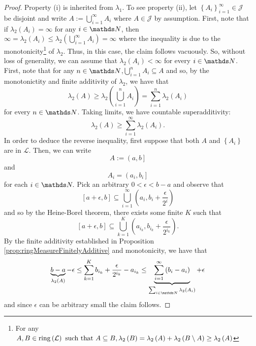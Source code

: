 \begin{proof}
Property (i) is inherited from $\lambda_{1}$. To see property (ii),
let $\left\{ A_{i}\right\} _{i=1}^{\infty}\in\mathcal{J}$ be disjoint
and write $A:=\bigcup_{i=1}^{\infty}A_{i}$ where $A\in\mathcal{J}$
by assumption. First, note that if $\lambda_{2}\left(A_{i}\right)=\infty$
for any $i\in\N$, then $\infty=\lambda_{2}\left(A_{i}\right)\leq\lambda_{2}\left(\bigcup_{i=1}^{\infty}A_{i}\right)=\infty$
where the inequality is due to the monotonicity\footnote{For any $A,B\in\mathrm{ring}\left(\mathcal{L}\right)\text{ such that }A\subseteq B,\lambda_{2}\left(B\right)=\lambda_{2}\left(A\right)+\lambda_{2}\left(B\setminus A\right)\geq\lambda_{2}\left(A\right)$}
of $\lambda_{2}$. Thus, in this case, the claim follows vacuously.
So, without loss of generality, we can assume that $\lambda_{2}\left(A_{i}\right)<\infty$
for every $i\in\N$. First, note that for any $n\in\N$,$\bigcup_{i=1}^{n}A_{i}\subseteq A$
and so, by the monotonictity and finite additivity of $\lambda_{2}$,
we have that
\[
\lambda_{2}\left(A\right)\geq\lambda_{2}\left(\bigcup_{i=1}^{n}A_{i}\right)=\sum_{i=1}^{n}\lambda_{2}\left(A_{i}\right)
\]
for every $n\in\N$. Taking limits, we have countable superadditivity:
\[
\lambda_{2}\left(A\right)\geq\sum_{i=1}^{\infty}\lambda_{2}\left(A_{i}\right).
\]
In order to deduce the reverse inequality, first suppose that both
$A$ and $\left\{ A_{i}\right\} $ are in $\mathcal{L}.$ Then, we
can write 
\[
A:=\left(a,b\right]
\]
and
\[
A_{i}=\left(a_{i},b_{i}\right]
\]
for each $i\in\N.$ Pick an arbitrary $0<\epsilon<b-a$ and observe
that 
\[
\left[a+\epsilon,b\right]\subseteq\bigcup_{i=1}^{\infty}\left(a_{i},b_{i}+\frac{\epsilon}{2^{i}}\right)
\]
and so by the Heine-Borel theorem, there exists some finite $K$ such
that 
\[
\left[a+\epsilon,b\right]\subseteq\bigcup_{k=1}^{K}\left(a_{i_{k}},b_{i_{k}}+\frac{\epsilon}{2^{i_{k}}}\right).
\]
By the finite additivity established in Proposition \ref{prop:ringMeasureFinitelyAdditive}
and monotonicity, we have that
\[
\underbrace{b-a}_{\lambda_{2}\left(A\right)}-\epsilon\leq\sum_{k=1}^{K}b_{i_{k}}+\frac{\epsilon}{2^{i_{k}}}-a_{i_{k}}\leq\underbrace{\sum_{i=1}^{\infty}\left(b_{i}-a_{i}\right)}_{\sum_{i\in\N}\lambda_{2}\left(A_{i}\right)}+\epsilon
\]
and since $\epsilon$ can be arbitrary small the claim follows.


\end{proof}
